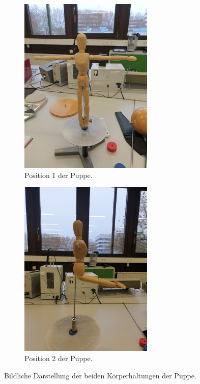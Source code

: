 \begin{figure}
    \centering
    \begin{subfigure}{0.5\textwidth}
      \begin{center}
      \includegraphics[width=0.7\textwidth]{Position_1.jpeg}
      \caption{Position 1 der Puppe.}
      \label{fig:sub1}
      \end{center}
    \end{subfigure}%
    \begin{subfigure}{0.5\textwidth}
      \begin{center}
      \includegraphics[width=0.7\textwidth]{Position_2.jpg}
      \caption{Position 2 der Puppe.}
      \label{fig:sub2}
      \end{center}
    \end{subfigure}
    \caption{Bildliche Darstellung der beiden Körperhaltungen der Puppe.}
    \label{fig:test}
\end{figure}